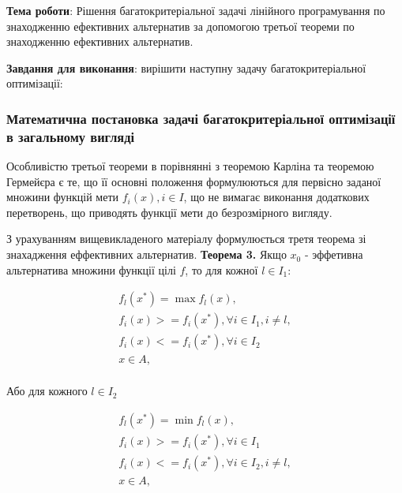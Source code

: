 


\newcommand{\labnumber}{1} %



\usepackage{systeme}
\usepackage{longtable,tabu}
\usepackage{multirow}
\usepackage{array,multirow}
\usepackage{pdflscape}
\usepackage{afterpage}
\usepackage{bm}

\graphicspath{{../figures/}}


\Ukrainian


\addtocounter{page}{1}

\textbf{Тема роботи}: Рішення багатокритеріальної задачі лінійного програмування по знаходженню ефективних альтернатив за допомогою третьої теореми по знаходженню ефективних альтернатив.

\textbf{Завдання для виконання}: вирішити наступну задачу багатокритеріальної оптимізації:


\subsubsection{Математична постановка задачі багатокритеріальної оптимізації в загальному вигляді}
Особливістю третьої теореми в порівнянні з теоремою Карліна та теоремою Гермейєра є те, що її основні положення формулюються для первісно заданої множини функцій мети ${f_i(x), i \in I}$, що не вимагає виконання додаткових перетворень, що приводять функції мети до безрозмірного вигляду. 

З урахуванням вищевикладеного матеріалу формулюється третя теорема зі знахадження еффективних альтернатив.
\textbf{Теорема 3.} 
Якщо $x_0$ - эффетивна альтернатива множини функції цілі $f$, то для кожної $l \in I_1$:

\begin{gather*} 
    f_l (x^*) = \max {f_l(x)}, \\
    f_i (x) >= f_i(x^*), \forall i \in I_1, i \not = l, \\
    f_i (x) <= f_i(x^*), \forall i \in I_2 \\
    x \in A, \\
\end{gather*}

Або для кожного $l \in I_2$

\begin{gather*} 
    f_l (x^*) = \min{f_l(x)}, \\
    f_i (x) >= f_i(x^*), \forall i \in I_1 \\
    f_i (x) <= f_i(x^*), \forall i \in I_2, i \not = l, \\
    x \in A, \\
\end{gather*}

